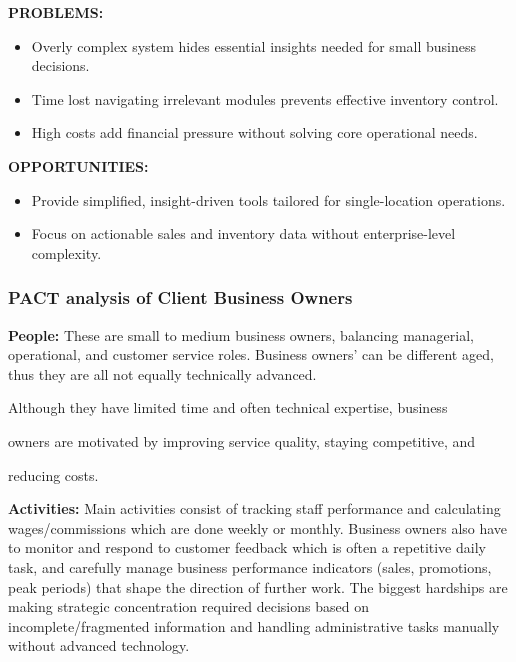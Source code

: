 \documentclass[]{VUMIFTemplateClass}
\begin{document}
\textbf{PROBLEMS:}
\begin{itemize}
    \item Overly complex system hides essential insights needed for small business decisions.
    \item Time lost navigating irrelevant modules prevents effective inventory control.
    \item High costs add financial pressure without solving core operational needs.
\end{itemize}

\textbf{OPPORTUNITIES:}
\begin{itemize}
    \item Provide simplified, insight-driven tools tailored for single-location operations.
    \item Focus on actionable sales and inventory data without enterprise-level complexity.
\end{itemize}

\subsubsection{PACT analysis of Client Business Owners}
    \textbf{People:} These are small to medium business owners, balancing managerial, operational, and customer service roles. Business owners’ can be different aged, thus they are all not equally technically advanced.

Although they have limited time and often technical expertise, business

owners are motivated by improving service quality, staying competitive, and

reducing costs.

    \textbf{Activities:} Main activities consist of tracking staff performance
and calculating wages/commissions which are done weekly or monthly. Business owners also have to monitor and
respond to customer feedback which is often a repetitive daily task, and carefully manage business performance indicators
(sales, promotions, peak periods) that shape the direction of further work. The biggest hardships are making
strategic concentration required decisions based on incomplete/fragmented information and handling
administrative tasks manually without advanced technology.
\end{document}
